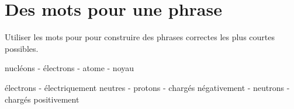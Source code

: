 \section{Des mots pour une phrase}

Utiliser les mots pour pour construire des phrases correctes les plus courtes possibles.

\begin{questions}
	\question nucléons - électrons - atome - noyau
	\fillwithdottedlines{1.5cm}
	
	\question électrons - électriquement neutres - protons - chargés négativement - neutrons - chargés positivement
	\fillwithdottedlines{2cm}
	
	
\end{questions}